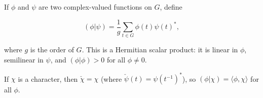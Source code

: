 If $\phi$ and $\psi$ are two complex-valued functions on $G$, define

$$(\phi|\psi) = \frac{1}{g} \sum_{t \in G} \phi(t)\psi(t)^*,$$

where $g$ is the order of $G$. This is a Hermitian scalar product: it is linear in $\phi$, semilinear in $\psi$, and $(\phi|\phi) > 0$ for all $\phi \neq 0$.

If $\chi$ is a character, then $\check{\chi} = \chi$ (where $\check{\psi}(t) = \psi(t^{-1})^*$), so $(\phi|\chi) = \langle \phi, \chi \rangle$ for all $\phi$.
